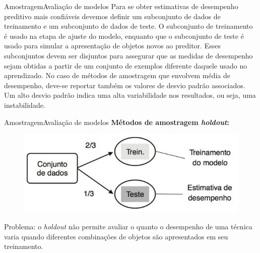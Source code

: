 \documentclass[t]{beamer}
\begin{document}

\begin{ftst}{Amostragem}{Avaliação de modelos}
\justifying
\small
Para se obter estimativas de desempenho preditivo mais confiáveis devemos definir um subconjunto de dados de treinamento e um subconjunto de dados de teste.
\vone
O subconjunto de treinamento é usado na etapa de ajuste do modelo, enquanto que o subconjunto de teste é usado para simular a apresentação de objetos novos ao preditor.
\vone
Esses subconjuntos devem ser disjuntos para assegurar que as medidas de desempenho sejam obtidas a partir de um conjunto de exemplos diferente daquele usado no aprendizado.
\vone
No caso de métodos de amostragem que envolvem média de desempenho, deve-se reportar também os valores de desvio padrão associados. Um alto desvio padrão indica uma alta variabilidade nos resultados, ou seja, uma instabilidade.

\end{ftst}


\begin{ftst}{Amostragem}{Avaliação de modelos}
\justifying
\textbf{Métodos de amostragem \textit{holdout}:}
\vone
\begin{figure}
    \centering
    \includegraphics[scale=0.7]{Figuras/slide04_02.jpg}
\end{figure}

Problema: o \textit{holdout} não permite avaliar o quanto o desempenho de uma técnica varia quando diferentes combinações de objetos são apresentados em seu treinamento.

\end{ftst}

\end{document}
